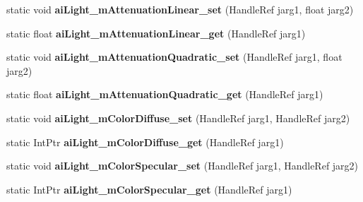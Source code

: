 \begin{DoxyCompactItemize}
\item 
\hypertarget{class_assimp_p_i_n_v_o_k_e_a1471ad54c43483b33cb2b75118f1b141}{static void {\bfseries ai\+Light\+\_\+m\+Attenuation\+Linear\+\_\+set} (Handle\+Ref jarg1, float jarg2)}\label{class_assimp_p_i_n_v_o_k_e_a1471ad54c43483b33cb2b75118f1b141}

\item 
\hypertarget{class_assimp_p_i_n_v_o_k_e_a016d7d7622a55baa248457246305c7d9}{static float {\bfseries ai\+Light\+\_\+m\+Attenuation\+Linear\+\_\+get} (Handle\+Ref jarg1)}\label{class_assimp_p_i_n_v_o_k_e_a016d7d7622a55baa248457246305c7d9}

\item 
\hypertarget{class_assimp_p_i_n_v_o_k_e_a2bda5c533c31f62083c340ad72e179f4}{static void {\bfseries ai\+Light\+\_\+m\+Attenuation\+Quadratic\+\_\+set} (Handle\+Ref jarg1, float jarg2)}\label{class_assimp_p_i_n_v_o_k_e_a2bda5c533c31f62083c340ad72e179f4}

\item 
\hypertarget{class_assimp_p_i_n_v_o_k_e_ac3007ffbd88e989ec769585935141793}{static float {\bfseries ai\+Light\+\_\+m\+Attenuation\+Quadratic\+\_\+get} (Handle\+Ref jarg1)}\label{class_assimp_p_i_n_v_o_k_e_ac3007ffbd88e989ec769585935141793}

\item 
\hypertarget{class_assimp_p_i_n_v_o_k_e_a41580102ee37d97ae1813d05eb3037fe}{static void {\bfseries ai\+Light\+\_\+m\+Color\+Diffuse\+\_\+set} (Handle\+Ref jarg1, Handle\+Ref jarg2)}\label{class_assimp_p_i_n_v_o_k_e_a41580102ee37d97ae1813d05eb3037fe}

\item 
\hypertarget{class_assimp_p_i_n_v_o_k_e_a7c8fbfe38d834abc4e35335e6029639e}{static Int\+Ptr {\bfseries ai\+Light\+\_\+m\+Color\+Diffuse\+\_\+get} (Handle\+Ref jarg1)}\label{class_assimp_p_i_n_v_o_k_e_a7c8fbfe38d834abc4e35335e6029639e}

\item 
\hypertarget{class_assimp_p_i_n_v_o_k_e_a8916176f0efe3ff613598235b43350e8}{static void {\bfseries ai\+Light\+\_\+m\+Color\+Specular\+\_\+set} (Handle\+Ref jarg1, Handle\+Ref jarg2)}\label{class_assimp_p_i_n_v_o_k_e_a8916176f0efe3ff613598235b43350e8}

\item 
\hypertarget{class_assimp_p_i_n_v_o_k_e_adbe2b88713ee3950c975dd698c6e39f3}{static Int\+Ptr {\bfseries ai\+Light\+\_\+m\+Color\+Specular\+\_\+get} (Handle\+Ref jarg1)}\label{class_assimp_p_i_n_v_o_k_e_adbe2b88713ee3950c975dd698c6e39f3}


\end{DoxyCompactItemize}
